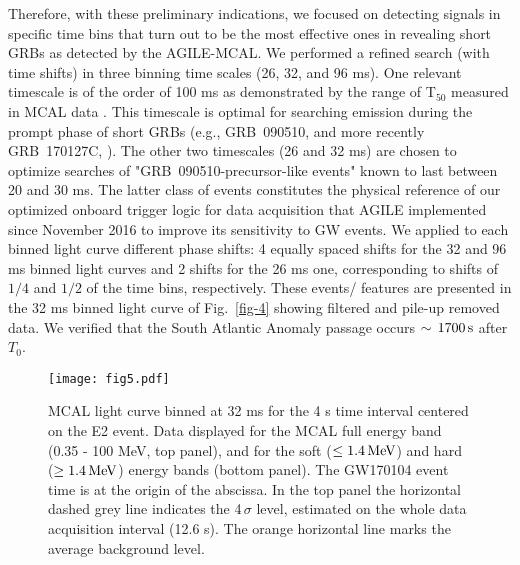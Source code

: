 \documentclass[preprint2]{aastex}
\def\gw {GW170104 }
\def \fv {}
\def \fvv {}
\def \fvvv {}
\def \fvr {}
\begin{document}
{\fvvv Therefore, with these preliminary indications, 
we focused on detecting signals in specific time bins that turn out to be the most effective ones
in revealing short GRBs as detected by the AGILE-MCAL. We performed a refined 
search {\fvr (with time shifts)} in three binning time scales (26, 32, and 96 ms). 
One relevant timescale is of the order of 100 ms as demonstrated by the
range of T$_{50}$ measured in MCAL data \cite[see Fig.~\ref{fig-4} of
][]{2013A&A...553A..33G}. This timescale is optimal for searching
emission during the prompt phase of short GRBs (e.g.,
GRB~090510, and more recently GRB~170127C, \citealt{2017GCN..20545...1U}). The
other two timescales (26 and 32 ms) are chosen to optimize
searches of "GRB~090510-precursor-like events" known to last
between 20 and 30 ms. The latter class of events constitutes the
physical reference of our optimized onboard trigger logic for
data acquisition that AGILE implemented since November 2016 to
improve its sensitivity to GW events.}
  We applied to each binned light curve
different phase shifts: 4 equally spaced shifts for the 32 and 96
ms binned light curves and 2 shifts for the 26 ms one,
corresponding to shifts of $1/4$ and $1/2$ of the time bins,
respectively.
%
{\fv These events/ features are {\fvv presented} in the 32 ms binned
light curve of Fig.~\ref{fig-4}
showing filtered and pile-up removed data}. {\fv We verified {\fvv that} the
South Atlantic Anomaly passage occurs $\sim \,1700\, \rm s$ after $T_0$}.

\begin{figure} [t!]
 \vspace*{0.2cm}
   \centerline{\texttt{[image: fig5.pdf]}}
\caption{ MCAL light curve binned at 32 ms for the 4 s time interval centered on the E2 event. Data displayed
 for the MCAL full energy band (0.35 - 100 MeV, top panel), and for the soft ($\leq 1.4 \, \rm MeV$) and hard ($\geq 1.4 \, \rm MeV$)
energy bands (bottom panel).
 The \gw event time is at the origin of the abscissa.
In the top panel the horizontal dashed grey line indicates the 4\,$\sigma$ level, estimated on the whole
data acquisition interval (12.6 s). The orange horizontal line marks the average background level.
}
\label{fig-5}
\end{figure}
\end{document}
